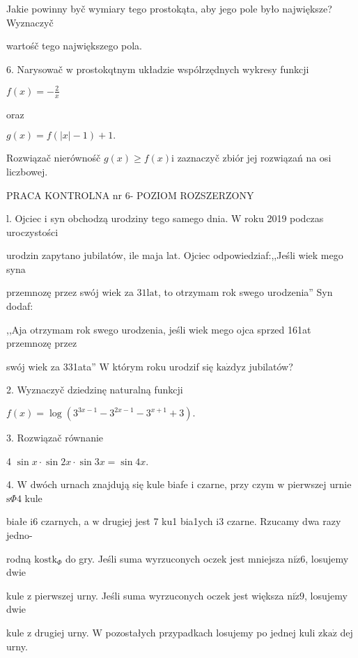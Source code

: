 \documentclass[a4paper,12pt]{article}
\begin{document}
Jakie powinny byč wymiary tego prostokąta, aby jego pole było największe? Wyznaczyč

wartośč tego największego pola.

6. Narysowač $\mathrm{w}$ prostokqtnym układzie wspólrzędnych wykresy funkcji

$f(x)=-\displaystyle \frac{2}{x}$

oraz

$g(x)=f(|x|-1)+1.$

Rozwiązač nierównośč $g(x)\geq f(x)\mathrm{i}$ zaznaczyč zbiór jej rozwiązań na osi liczbowej.




PRACA KONTROLNA nr 6- POZIOM ROZSZERZONY

l. Ojciec $\mathrm{i}$ syn obchodzą urodziny tego samego dnia. $\mathrm{W}$ roku 2019 podczas uroczystości

urodzin zapytano jubilatów, ile maja lat. Ojciec odpowiedziaf:,,Jeśli wiek mego syna

przemnozę przez swój wiek za $31\mathrm{l}\mathrm{a}\mathrm{t}$, to otrzymam rok swego urodzenia'' Syn dodaf:

,,Aja otrzymam rok swego urodzenia, jeśli wiek mego ojca sprzed 161at przemnozę przez

swój wiek za 331ata'' $\mathrm{W}$ którym roku urodzif się $\mathrm{k}\mathrm{a}\dot{\mathrm{z}}\mathrm{d}\mathrm{y}\mathrm{z}$ jubilatów?

2. Wyznaczyč dziedzinę naturalną funkcji

$f(x)=\log(3^{3x-1}-3^{2x-1}-3^{x+1}+3).$

3. Rozwiązač równanie

4 $\sin x\cdot\sin 2x\cdot\sin 3x=\sin 4x.$

4. $\mathrm{W}$ dwóch urnach znajdują się kule biafe $\mathrm{i}$ czarne, przy czym $\mathrm{w}$ pierwszej urnie $\mathrm{s}\Phi 4$ kule

białe $\mathrm{i}6$ czarnych, a $\mathrm{w}$ drugiej jest 7 ku1 bia1ych $\mathrm{i}3$ czarne. Rzucamy dwa razy jedno-

rodną $\mathrm{k}\mathrm{o}\mathrm{s}\mathrm{t}\mathrm{k}_{\Phi}$ do gry. Jeśli suma wyrzuconych oczek jest mniejsza $\mathrm{n}\mathrm{i}\dot{\mathrm{z}}6$, losujemy dwie

kule $\mathrm{z}$ pierwszej urny. Jeśli suma wyrzuconych oczek jest większa $\mathrm{n}\mathrm{i}\dot{\mathrm{z}}9$, losujemy dwie

kule $\mathrm{z}$ drugiej urny. $\mathrm{W}$ pozostałych przypadkach losujemy po jednej kuli $\mathrm{z}\mathrm{k}\mathrm{a}\dot{\mathrm{z}}$ dej urny.
\end{document}
